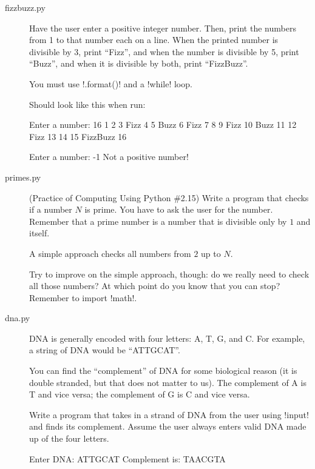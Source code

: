 \documentclass[11pt]{cselabheader}
\begin{document}
\begin{description}
  \item[fizzbuzz.py] Have the user enter a positive integer number. Then, print
    the numbers from 1 to that number each on a line. When the printed number is
    divisible by 3, print ``Fizz'', and when the number is divisible by 5, print
    ``Buzz'', and when it is divisible by both, print ``FizzBuzz''.

    You must use \pythoninline!.format()! and a \pythoninline!while! loop.

    Should look like this when run:

    \begin{bashcode}
Enter a number: 16
1
2
3 Fizz
4
5 Buzz
6 Fizz
7
8
9 Fizz
10 Buzz
11
12 Fizz
13
14
15 FizzBuzz
16
    \end{bashcode}

    \begin{bashcode}
Enter a number: -1
Not a positive number!
    \end{bashcode}


  \item[primes.py] (Practice of Computing Using Python \#2.15) Write a program
    that checks if a number $N$ is prime. You have to ask the user for the
    number. Remember that a prime
    number is a number that is divisible only by $1$ and itself.

    A simple approach checks all numbers from $2$ up to $N$.

    Try to improve on the simple approach, though: do we really need to check
    all those numbers? At which point do you know that you can stop? Remember to
    import \pythoninline!math!.

  \item[dna.py] 
    DNA is generally encoded with four letters: A, T, G, and C. For example, a
    string of DNA would be ``ATTGCAT''.

    You can find the ``complement'' of DNA for some biological reason (it is
    double stranded, but that does not matter to us). The complement of A is T
    and vice versa; the complement of G is C and vice versa.

    Write a program that takes in a strand of DNA from the user using
    \pythoninline!input! and finds its complement. Assume the user always enters
    valid DNA made up of the four letters.

    \begin{bashcode}
Enter DNA: ATTGCAT
Complement is: TAACGTA
    \end{bashcode}

\end{description}
\end{document}
